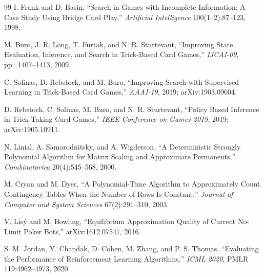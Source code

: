 \documentclass[11pt]{article}
\theoremstyle{definition}
\begin{document}
\begin{thebibliography}{99}
I. Frank and D. Basin, ``Search in Games with Incomplete Information: A Case
Study Using Bridge Card Play,'' \emph{Artificial Intelligence}
100(1--2):87--123, 1998.

M. Buro, J. R. Long, T. Furtak, and N. R. Sturtevant, ``Improving State
Evaluation, Inference, and Search in Trick-Based Card Games,'' \emph{IJCAI-09},
pp.~1407--1413, 2009.

C. Solinas, D. Rebstock, and M. Buro, ``Improving Search with Supervised
Learning in Trick-Based Card Games,'' \emph{AAAI-19}, 2019; arXiv:1903.09604.

D. Rebstock, C. Solinas, M. Buro, and N. R. Sturtevant, ``Policy Based Inference
in Trick-Taking Card Games,'' \emph{IEEE Conference on Games 2019}, 2019;
arXiv:1905.10911.

N. Linial, A. Samorodnitsky, and A. Wigderson, ``A Deterministic Strongly
Polynomial Algorithm for Matrix Scaling and Approximate Permanents,''
\emph{Combinatorica} 20(4):545--568, 2000.

M. Cryan and M. Dyer, ``A Polynomial-Time Algorithm to Approximately Count
Contingency Tables When the Number of Rows Is Constant,'' \emph{Journal of
Computer and System Sciences} 67(2):291--310, 2003.

V. Lis\'y and M. Bowling, ``Equilibrium Approximation Quality of Current
No-Limit Poker Bots,'' arXiv:1612.07547, 2016.

S. M. Jordan, Y. Chandak, D. Cohen, M. Zhang, and P. S. Thomas, ``Evaluating the
Performance of Reinforcement Learning Algorithms,'' \emph{ICML 2020},
PMLR 119:4962--4973, 2020.

\end{thebibliography}
\end{document}
